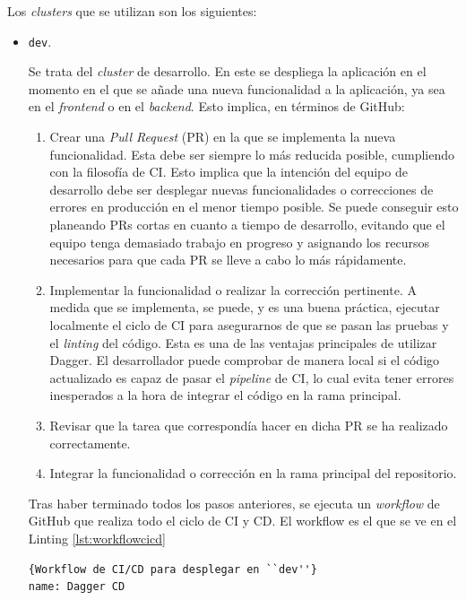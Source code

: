 Los \textit{clusters} que se utilizan son los siguientes:

\begin{itemize}
  \item \texttt{dev}.

    Se trata del \textit{cluster} de desarrollo. En este se despliega la aplicación en el momento en el que se añade una nueva funcionalidad a la aplicación, ya sea en el \textit{frontend} o en el \textit{backend}. Esto implica, en términos de GitHub:

    \begin{enumerate}
      \item Crear una \textit{Pull Request} (PR) en la que se implementa la nueva funcionalidad. Esta debe ser siempre lo más reducida posible, cumpliendo con la filosofía de CI. Esto implica que la intención del equipo de desarrollo debe ser desplegar nuevas funcionalidades o correcciones de errores en producción en el menor tiempo posible. Se puede conseguir esto planeando PRs cortas en cuanto a tiempo de desarrollo, evitando que el equipo tenga demasiado trabajo en progreso y asignando los recursos necesarios para que cada PR se lleve a cabo lo más rápidamente\cite{linear}.
      \item Implementar la funcionalidad o realizar la corrección pertinente. A medida que se implementa, se puede, y es una buena práctica, ejecutar localmente el ciclo de CI para asegurarnos de que se pasan las pruebas y el \textit{linting} del código. Esta es una de las ventajas principales de utilizar Dagger. El desarrollador puede comprobar de manera local si el código actualizado es capaz de pasar el \textit{pipeline} de CI, lo cual evita tener errores inesperados a la hora de integrar el código en la rama principal.
      \item Revisar que la tarea que correspondía hacer en dicha PR se ha realizado correctamente.
      \item Integrar la funcionalidad o corrección en la rama principal del repositorio.
    \end{enumerate}

    Tras haber terminado todos los pasos anteriores, se ejecuta un \textit{workflow} de GitHub que realiza todo el ciclo de CI y CD. El workflow es el que se ve en el Linting  \ref{lst:workflowcicd}

    \begin{lstlisting}[language=workflows,label=lst:workflowcicd]{Workflow de CI/CD para desplegar en ``dev''}
name: Dagger CD


\end{lstlisting}
\end{itemize}
